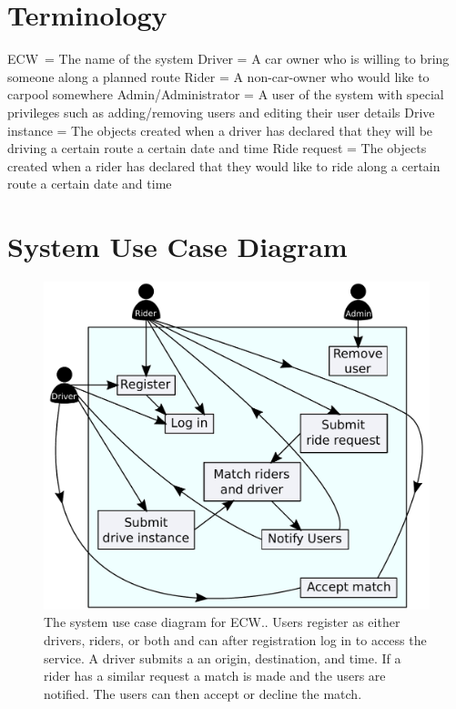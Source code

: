 \documentclass{article}
\newcommand{\name}{ECW\ }
\newcommand{\namep}{ECW.}
\begin{document}
\section{Terminology}
\name = The name of the system\newline
Driver = A car owner who is willing to bring someone along a planned route\newline
Rider = A non-car-owner who would like to carpool somewhere\newline
Admin/Administrator = A user of the system with special privileges such as adding/removing users and editing their user details
Drive instance = The objects created when a driver has declared that they will be driving a certain route a certain date and time
Ride request = The objects created when a rider has declared that they would like to ride along a certain route a certain date and time

\newpage
\section{System Use Case Diagram}
\begin{figure}[!htpb]
    \centering
    \includegraphics[scale=0.75]{system_case_diagram.pdf}
    \caption{The system use case diagram for \namep. Users register as either drivers, riders, or both and can after registration log in to access the service. A driver submits a an origin, destination, and time. If a rider has a similar request a match is made and the users are notified. The users can then accept or decline the match.}
    \label{fig:useCaseDiagram}
\end{figure}
\end{document}
